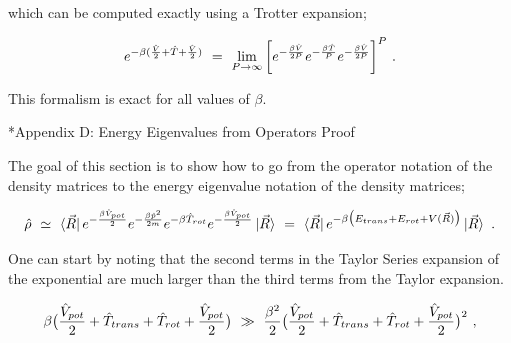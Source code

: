 \documentclass[11pt]{article}
\makeatletter
\let\workreportsection\section
\renewcommand{\section}{\@ifstar{\workreportstarsection}{\workreportsection}}
\newcommand{\workreportstarsection}[1]{\workreportsection*{#1}\addcontentsline{toc}{section}{#1}}
\makeatother
\begin{document}
which can be computed exactly using a Trotter expansion;

\begin{equation} \label{wr-eq-10-2}
e^{-\beta ( \frac{\hat{V}}{2} + \hat{T} + \frac{\hat{V}}{2} )} \hspace{0.125cm} = \hspace{0.125cm} \lim_{P \rightarrow \infty} \bigg[ e^{- \frac{\beta \hat{V}}{2P}} e^{- \frac{\beta \hat{T}}{P}} e^{- \frac{\beta \hat{V}}{2P}} \bigg]^P \hspace{0.125cm} .  
\end{equation}

This formalism is exact for all values of \begin{math} \beta \end{math}.

\hypertarget{wr-appendix-d}{}
\section*{Appendix D: Energy Eigenvalues from Operators Proof}
\label{wr-app-fthappx-1}

The goal of this section is to show how to go from the operator notation of the density matrices to the energy eigenvalue notation of the density matrices;

\begin{equation} 
\hat{\rho} \hspace{0.125cm} \simeq \hspace{0.125cm} \bra{\vec{R}} e^{- \frac{ \beta \hat{V}_{pot}}{2}} e^{- \frac{\beta \hat{p}^2}{2 m}} e^{-\beta \hat{T}_{rot}} e^{- \frac{ \beta \hat{V}_{pot}}{2}} \ket{\vec{R}} \hspace{0.125cm} = \hspace{0.125cm} \bra{\vec{R}} e^{ - \beta \big( E_{trans} + E_{rot} + V(\vec{R})\big)} \ket{\vec{R}} \hspace{0.125cm} . 
\end{equation}

One can start by noting that the second terms in the Taylor Series expansion of the exponential are much larger than the third terms from the Taylor expansion.

\begin{equation} \label{wr-eq-40-1}
\beta \big( \frac{\hat{V}_{pot}}{2} + \hat{T}_{trans} + \hat{T}_{rot} + \frac{\hat{V}_{pot}}{2} \big)  \hspace{0.125cm} \gg \hspace{0.125cm} \frac{\beta^2}{2} \big( \frac{\hat{V}_{pot}}{2} + \hat{T}_{trans} + \hat{T}_{rot} + \frac{\hat{V}_{pot}}{2} \big)^2 \hspace{0.125cm} ,
\end{equation}
\end{document}
